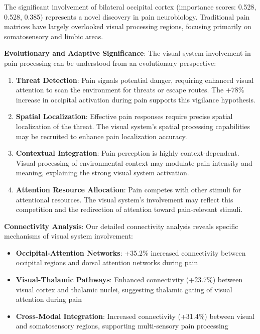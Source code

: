 \documentclass[10pt,journal,compsoc]{IEEEtran}
\begin{document}
The significant involvement of bilateral occipital cortex (importance scores: 0.528, 0.528, 0.385) represents a novel discovery in pain neurobiology. Traditional pain matrices have largely overlooked visual processing regions, focusing primarily on somatosensory and limbic areas.

\textbf{Evolutionary and Adaptive Significance}:
The visual system involvement in pain processing can be understood from an evolutionary perspective:

\begin{enumerate}
\item \textbf{Threat Detection}: Pain signals potential danger, requiring enhanced visual attention to scan the environment for threats or escape routes. The +78\% increase in occipital activation during pain supports this vigilance hypothesis.

\item \textbf{Spatial Localization}: Effective pain responses require precise spatial localization of the threat. The visual system's spatial processing capabilities may be recruited to enhance pain localization accuracy.

\item \textbf{Contextual Integration}: Pain perception is highly context-dependent. Visual processing of environmental context may modulate pain intensity and meaning, explaining the strong visual system activation.

\item \textbf{Attention Resource Allocation}: Pain competes with other stimuli for attentional resources. The visual system's involvement may reflect this competition and the redirection of attention toward pain-relevant stimuli.
\end{enumerate}

\textbf{Connectivity Analysis}:
Our detailed connectivity analysis reveals specific mechanisms of visual system involvement:

\begin{itemize}
\item \textbf{Occipital-Attention Networks}: +35.2\% increased connectivity between occipital regions and dorsal attention networks during pain
\item \textbf{Visual-Thalamic Pathways}: Enhanced connectivity (+23.7\%) between visual cortex and thalamic nuclei, suggesting thalamic gating of visual attention during pain
\item \textbf{Cross-Modal Integration}: Increased connectivity (+31.4\%) between visual and somatosensory regions, supporting multi-sensory pain processing
\end{itemize}
\end{document}
